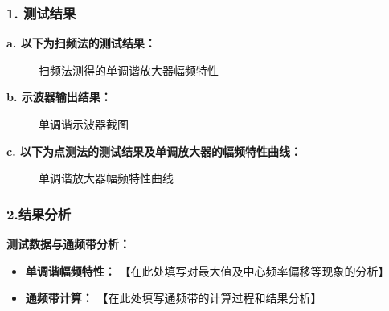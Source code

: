 \documentclass[12pt]{article}
\begin{document}
\subsubsection*{1. 测试结果}

\textbf{a. 以下为扫频法的测试结果：}

\begin{figure}[H]
\centering
\caption{扫频法测得的单调谐放大器幅频特性}
\label{fig:sweep_freq_result}
\end{figure}

\textbf{b. 示波器输出结果：}
\begin{figure}[H]
\centering
\caption{单调谐示波器截图}
\label{fig:osc_result}
\end{figure}


\textbf{c. 以下为点测法的测试结果及单调放大器的幅频特性曲线：}

\begin{table}[H]
    \centering
    \caption{单调谐放大器幅频特性测试结果}
\end{table}

\begin{figure}[H]
\centering
\caption{单调谐放大器幅频特性曲线}
\label{fig:single_tuned_curve}
\end{figure}

\subsubsection*{2.结果分析}

\textbf{测试数据与通频带分析：}
\begin{itemize}
    \item \textbf{单调谐幅频特性：} 【在此处填写对最大值及中心频率偏移等现象的分析】
    \item \textbf{通频带计算：} 【在此处填写通频带的计算过程和结果分析】
\end{itemize}
\end{document}
